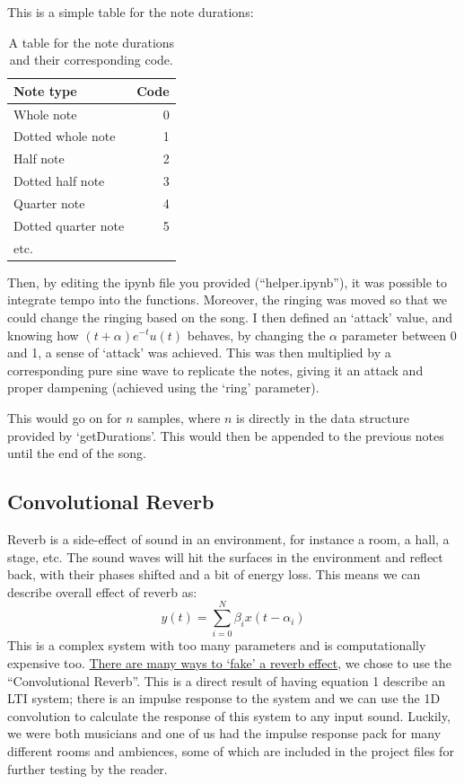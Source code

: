 \documentclass[12pt]{article}
\begin{document}
This is a simple table for the note durations:
\begin{table}[h!]
\centering
\begin{tabular}{lr} 
    \hline
    \textbf{Note type}& \textbf{Code}\\ 
    \hline
    Whole note& 0\\
    \hline
    Dotted whole note& 1\\
    \hline
    Half note& 2\\
    \hline
    Dotted half note& 3 \\
    \hline
    Quarter note & 4\\
    \hline
    Dotted quarter note & 5\\
    \hline
    etc.
\end{tabular}
\caption{A table for the note durations and their corresponding code.}
\label{table:1}
\end{table}

Then, by editing the ipynb file you provided (``helper.ipynb''), it was possible to integrate
tempo into the functions. Moreover, the ringing was moved so that we could change the ringing
based on the song. I then defined an `attack' value, and knowing how $(t+\alpha)e^{-t}u(t)$ behaves,
by changing the $\alpha$ parameter between 0 and 1, a sense of `attack' was achieved.
This was then multiplied by a corresponding pure sine wave to replicate the notes, giving it an attack and
proper dampening (achieved using the `ring' parameter).

This would go on for $n$ samples, where $n$ is directly in the data structure provided by
`getDurations'. This would then be appended to the previous notes until the end of the song.

\subsection{Convolutional Reverb}
Reverb is a side-effect of sound in an environment, for instance a room, a hall, a stage, etc.
The sound waves will hit the surfaces in the environment and reflect back, with their phases shifted
and a bit of energy loss. This means we can describe overall effect of reverb as:
\begin{equation*}
    y(t) = \sum^{N}_{i=0} \beta_i x(t-\alpha_i)
    \label{eq:1}
\end{equation*}
This is a complex system with too many parameters and is computationally expensive too. \href{https://en.wikipedia.org/wiki/Reverb_effect}
{There are many ways to `fake' a reverb effect}, we chose to use the ``Convolutional Reverb''.
This is a direct result of having equation 1 describe an LTI system; there is an impulse response to the system
and we can use the 1D convolution to calculate the response of this system to any input sound.
Luckily, we were both musicians and one of us had the impulse response pack for many different
rooms and ambiences, some of which are included in the project files for further testing by the reader.
\end{document}
